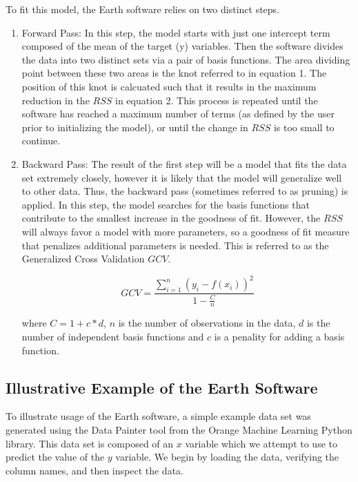 To fit this model, the Earth software relies on two distinct steps.
\begin{enumerate}


\item Forward Pass: In this step, the model starts with just one intercept term composed of the mean of the target (y) variables. Then the software divides the data into two distinct sets via a pair of basis functions. The area dividing point between these two areas is the knot referred to in equation 1. The position of this knot is calcuated such that it results in the maximum reduction in the $RSS$ in equation 2. This process is repeated until the software has reached a maximum number of terms (as defined by the user prior to initializing the model), or until the change in $RSS$ is too small to continue.

\item Backward Pass: The result of the first step will be a model that fits the data set extremely closely, however it is likely that the model will generalize well to other data. Thus, the backward pass (sometimes referred to as pruning) is applied. In this step, the model searches for the basis functions that contribute to the smallest increase in the goodness of fit. However, the $RSS$ will always favor a model with more parameters, so a goodness of fit measure that penalizes additional parameters is needed. This is referred to as the Generalized Cross Validation $GCV$.



\begin{equation}
GCV=\frac{\sum_{i=1}^{n} (y_{i}-f(x_{i}))^{2}}{1-\frac{C}{n}}
\end{equation}

where $C=1+c*d$, $n$ is the number of observations in the data, $d$ is the number of independent basis functions and $c$ is a penality for adding a basis function.
 
\end{enumerate}




\subsection{Illustrative Example of the Earth Software} %

To illustrate usage of the Earth software, a simple example data set was generated using the Data Painter tool from the Orange Machine Learning Python library. This data set is composed of an $x$ variable which we attempt to use to predict the value of the $y$ variable. We begin by loading the data, verifying the column names, and then inspect the data.

